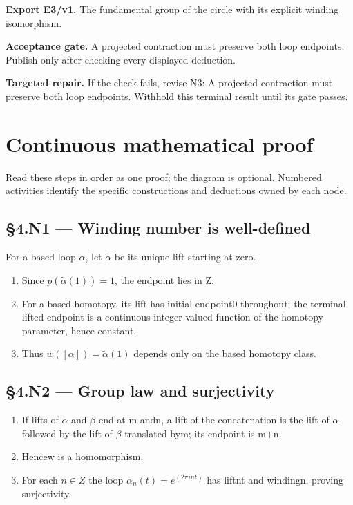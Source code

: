 \documentclass[preprint,12pt,aps,pra,showkeys,amsmath,amssymb,superscriptaddress,floatfix]{revtex4-2}
\theoremstyle{definition}
\theoremstyle{remark}
\newcommand{\field}[2]{\par\smallskip\noindent\textbf{#1.} #2\par}
\begin{document}
\field{Export E3/v1}{The fundamental group of the circle with its explicit winding
isomorphism.}

\field{Acceptance gate}{A projected contraction must preserve both loop endpoints. Publish only
after checking every displayed deduction.}

\field{Targeted repair}{If the check fails, revise N3: A projected contraction must preserve
both loop endpoints. Withhold this terminal result until its gate
passes.}

\endgroup\clearpage\section{Continuous mathematical proof}\label{sec:proof}

Read these steps in order as one proof; the diagram is optional.
Numbered activities identify the specific constructions and deductions
owned by each node.

\subsection{§4.N1 --- Winding number is
well-defined}\label{n1-winding-number-is-well-defined}

For a based loop \(\alpha\), let \(\widetilde\alpha\) be its unique lift
starting at zero.

\begin{enumerate}
\def\labelenumi{\arabic{enumi}.}
\item
  Since \(p(\widetilde{\alpha}(1))=1\), the endpoint lies in Z.
\item
  For a based homotopy, its lift has initial endpoint0 throughout; the
  terminal lifted endpoint is a continuous integer-valued function of
  the homotopy parameter, hence constant.
\item
  Thus \(w([\alpha ])=\widetilde{\alpha}(1)\) depends only on the based
  homotopy class.
\end{enumerate}

\subsection{§4.N2 --- Group law and
surjectivity}\label{n2-group-law-and-surjectivity}

\begin{enumerate}
\def\labelenumi{\arabic{enumi}.}
\item
  If lifts of \(\alpha\) and \(\beta\) end at m andn, a lift of the
  concatenation is the lift of \(\alpha\) followed by the lift of
  \(\beta\) translated bym; its endpoint is m+n.
\item
  Hencew is a homomorphism.
\item
  For each \(n\in Z\) the loop \(\alpha _n(t)=e^{(2\pi int)}\) has
  liftnt and windingn, proving surjectivity.
\end{enumerate}
\end{document}
